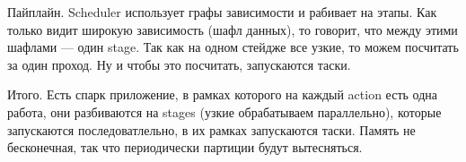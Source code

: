 \documentclass[12pt]{article}
\begin{document}
Пайплайн. Scheduler использует графы зависимости и рабивает на этапы. Как только видит широкую зависимость (шафл данных), то говорит, что между этими шафлами --- один stage. Так как на одном стейдже все узкие, то можем посчитать за один проход. Ну и чтобы это посчитать, запускаются таски.

Итого. Есть спарк приложение, в рамках которого на каждый action есть одна работа, они разбиваются на stages (узкие обрабатываем параллельно), которые запускаются последоватлельно, в их рамках запускаются таски. Память не бесконечная, так что периодически партиции будут вытесняться.
\end{document}
